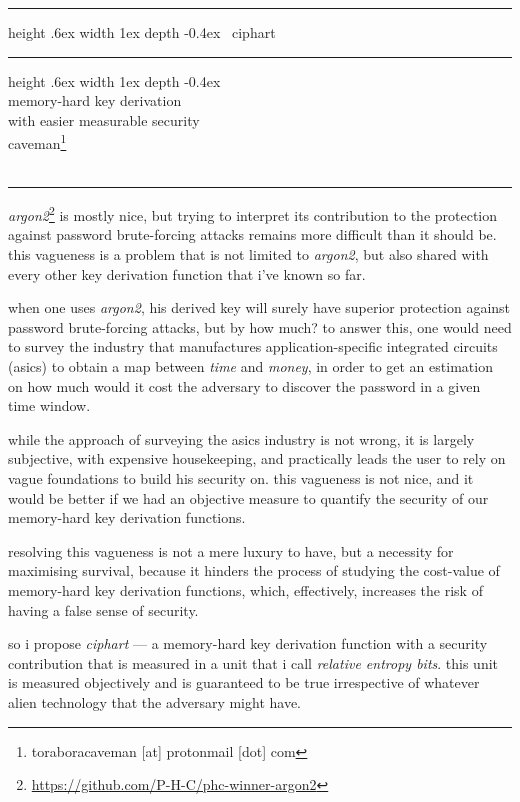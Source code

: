 \documentclass[twocolumn]{article}
\makeatletter
\def\myrulefill{%
    \leavevmode\leaders\hrule%
    height .6ex width 1ex depth -0.4ex%
    \hfill\kern\z@%
}
\makeatother
\begin{document}
\SetInd{.1em}{1em}

\begin{center}
\Huge
\myrulefill\ ciphart \myrulefill\\
\LARGE
memory-hard key derivation \\
with easier measurable security\\
\normalsize
caveman\footnote{toraboracaveman [at] protonmail [dot] com}\\
\footnotesize
\DTMnow\\
\rule{1\columnwidth}{2pt}
\end{center}

\emph{argon2}\footnote{\url{https://github.com/P-H-C/phc-winner-argon2}} is
mostly nice, but trying to interpret its contribution to the protection
against password brute-forcing attacks remains more difficult than it
should be.  this vagueness is a problem that is not limited to
\emph{argon2}, but also shared with every other key derivation function
that i've known so far.

when one uses \emph{argon2}, his derived key will surely have superior
protection against password brute-forcing attacks, but by how much?  to
answer this, one would need to survey the industry that manufactures
application-specific integrated circuits (asics) to obtain a map between
\emph{time} and \emph{money}, in order to get an estimation on how much
would it cost the adversary to discover the password in a given time
window.

while the approach of surveying the asics industry is not wrong, it is
largely subjective, with expensive housekeeping, and practically leads the
user to rely on vague foundations to build his security on.  this vagueness
is not nice, and it would be better if we had an objective measure to
quantify the security of our memory-hard key derivation functions.

resolving this vagueness is not a mere luxury to have, but a necessity for
maximising survival, because it hinders the process of studying the
cost-value of memory-hard key derivation functions, which, effectively,
increases the risk of having a false sense of security.

so i propose \emph{ciphart} --- a memory-hard key derivation function with
a security contribution that is measured in a unit that i call
\emph{relative entropy bits}.  this unit is measured objectively and is
guaranteed to be true irrespective of whatever alien technology that the
adversary might have.
\end{document}
